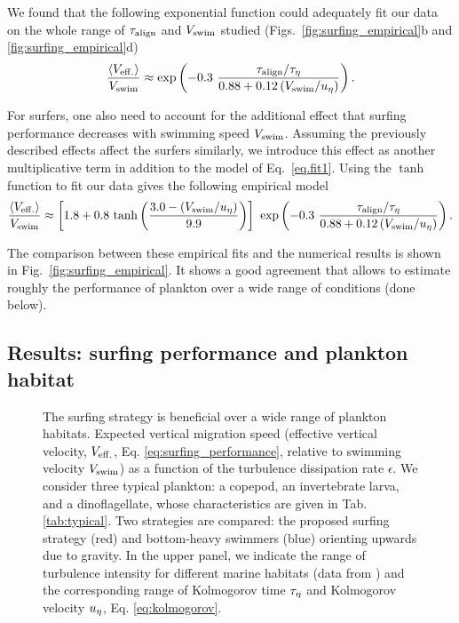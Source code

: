 We found that the following exponential function could adequately fit our data on the whole range of $\tau_{\mathrm{align}}$ and $V_{\mathrm{swim}}$ studied (Figs.~\ref{fig:surfing_empirical}b and \ref{fig:surfing_empirical}d)
\begin{equation}\label{eq.fit1}
\frac{\left\langle V_{\mathrm{eff.}} \right\rangle}{V_{\mathrm{swim}}} \approx
	 \mathrm{exp} \left( - 0.3 ~ \frac{\tau_{\mathrm{align}}/\tau_{\eta}}{0.88 + 0.12 \left( V_{\mathrm{swim}}/u_{\eta} \right) } \right).
\end{equation}

For surfers, one also need to account for the additional effect that surfing performance decreases with swimming speed $V_{\mathrm{swim}}$.
Assuming the previously described effects affect the surfers similarly, we introduce this effect as another multiplicative term in addition to the model of Eq.~\ref{eq.fit1}.
Using the $\tanh$ function to fit our data gives the following empirical model
\begin{equation}\label{eq.fit2}
	\frac{\left\langle V_{\mathrm{eff.}} \right\rangle}{V_{\mathrm{swim}}} \approx
	 \left[ 1.8 + 0.8 ~ \mathrm{tanh} \left( \frac{3.0 - \left( V_{\mathrm{swim}}/u_{\eta} \right)}{9.9} \right) \right] ~
	 \mathrm{exp} \left( - 0.3 ~ \frac{\tau_{\mathrm{align}}/\tau_{\eta}}{0.88 + 0.12 \left( V_{\mathrm{swim}}/u_{\eta} \right) } \right).
\end{equation}

The comparison between these empirical fits and the numerical results is shown in Fig.~\ref{fig:surfing_empirical}. 
It shows a good agreement that allows to estimate roughly the performance of plankton over a wide range of conditions (done below).

\subsection{Results: surfing performance and plankton habitat}\label{sec:bio_results}

\begin{figure}
	\centering
	\def\svgwidth{0.8\textwidth}
	
	\caption[The surfing strategy is beneficial over a wide range of plankton habitats.]{
		The surfing strategy is beneficial over a wide range of plankton habitats.
		Expected vertical migration speed (effective vertical velocity, $V_{\mathrm{eff.}}$, Eq. \eqref{eq:surfing_performance}, relative to swimming velocity $V_{\mathrm{swim}}$) as a function of the turbulence dissipation rate $\epsilon$.%
		We consider three typical plankton: a copepod, an invertebrate larva, and a dinoflagellate,  whose characteristics are given in Tab. \ref{tab:typical}.
		Two strategies are compared: the proposed surfing strategy (red) and bottom-heavy swimmers (blue) orienting upwards due to gravity.
		In the upper panel, we indicate the  range of turbulence intensity for different marine habitats (data from \citep{fuchs2016seascape}) and the corresponding range of  Kolmogorov time $\tau_{\eta}$ and Kolmogorov velocity $u_{\eta}$, Eq. \eqref{eq:kolmogorov}.
	}
	\label{fig:surfing_bio}
\end{figure}

